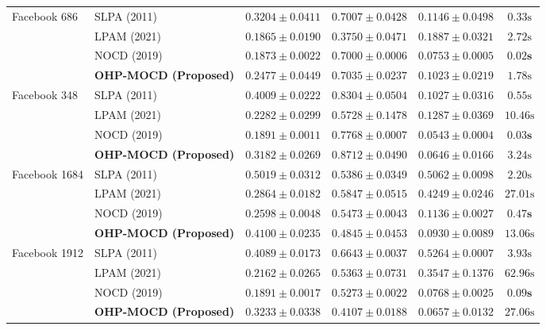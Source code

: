 \documentclass{svproc}
\begin{document}
\begin{table}[t]
{\begin{tabular}{@{}llcccc@{}}
\midrule
Facebook 686 & SLPA (2011) & $\mathbf{0.3204 \pm 0.0411}$ & $0.7007 \pm 0.0428$ & $0.1146 \pm 0.0498$ & $0.33\text{s}$ \\
 & LPAM (2021) & $0.1865 \pm 0.0190$ & $0.3750 \pm 0.0471$ & $\mathbf{0.1887 \pm 0.0321}$ & $2.72\text{s}$ \\
 & NOCD (2019) & $0.1873 \pm 0.0022$ & $0.7000 \pm 0.0006$ & $0.0753 \pm 0.0005$ & $\mathbf{0.02\text{s}}$ \\
 & \textbf{OHP-MOCD (Proposed)} & $0.2477 \pm 0.0449$ & $\mathbf{0.7035 \pm 0.0237}$ & $0.1023 \pm 0.0219$ & $1.78\text{s}$ \\
\midrule
Facebook 348 & SLPA (2011) & $\mathbf{0.4009 \pm 0.0222}$ & $0.8304 \pm 0.0504$ & $0.1027 \pm 0.0316$ & $0.55\text{s}$ \\
 & LPAM (2021) & $0.2282 \pm 0.0299$ & $0.5728 \pm 0.1478$ & $\mathbf{0.1287 \pm 0.0369}$ & $10.46\text{s}$ \\
 & NOCD (2019) & $0.1891 \pm 0.0011$ & $0.7768 \pm 0.0007$ & $0.0543 \pm 0.0004$ & $\mathbf{0.03\text{s}}$ \\
 & \textbf{OHP-MOCD (Proposed)} & $0.3182 \pm 0.0269$ & $\mathbf{0.8712 \pm 0.0490}$ & $0.0646 \pm 0.0166$ & $3.24\text{s}$ \\
\midrule
Facebook 1684 & SLPA (2011) & $\mathbf{0.5019 \pm 0.0312}$ & $0.5386 \pm 0.0349$ & $\mathbf{0.5062 \pm 0.0098}$ & $2.20\text{s}$ \\
 & LPAM (2021) & $0.2864 \pm 0.0182$ & $\mathbf{0.5847 \pm 0.0515}$ & $0.4249 \pm 0.0246$ & $27.01\text{s}$ \\
 & NOCD (2019) & $0.2598 \pm 0.0048$ & $0.5473 \pm 0.0043$ & $0.1136 \pm 0.0027$ & $\mathbf{0.47\text{s}}$ \\
 & \textbf{OHP-MOCD (Proposed)} & $0.4100 \pm 0.0235$ & $0.4845 \pm 0.0453$ & $0.0930 \pm 0.0089$ & $13.06\text{s}$ \\
\midrule
Facebook 1912 & SLPA (2011) & $\mathbf{0.4089 \pm 0.0173}$ & $\mathbf{0.6643 \pm 0.0037}$ & $\mathbf{0.5264 \pm 0.0007}$ & $3.93\text{s}$ \\
 & LPAM (2021) & $0.2162 \pm 0.0265$ & $0.5363 \pm 0.0731$ & $0.3547 \pm 0.1376$ & $62.96\text{s}$ \\
 & NOCD (2019) & $0.1891 \pm 0.0017$ & $0.5273 \pm 0.0022$ & $0.0768 \pm 0.0025$ & $\mathbf{0.09\text{s}}$ \\
 & \textbf{OHP-MOCD (Proposed)} & $0.3233 \pm 0.0338$ & $0.4107 \pm 0.0188$ & $0.0657 \pm 0.0132$ & $27.06\text{s}$ \\

\end{tabular}}
\end{table}
\end{document}
